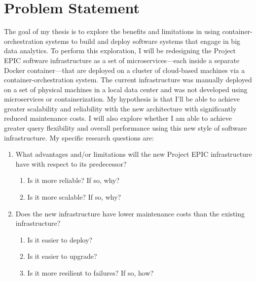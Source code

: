
\chapter{Problem Statement} %

\label{Chapter3} %

The goal of my thesis is to explore the benefits and limitations in using container-orchestration systems to build and deploy software systems that engage in big data analytics. To perform this exploration, I will be redesigning the Project EPIC software infrastructure as a set of microservices---each inside a separate Docker container---that are deployed on a cluster of cloud-based machines via a container-orchestration system. The current infrastructure was manually deployed on a set of physical machines in a local data center and was not developed using microservices or containerization. My hypothesis is that I’ll be able to achieve greater scalability and reliability with the new architecture with significantly reduced maintenance costs. I will also explore whether I am able to achieve greater query flexibility and overall performance using this new style of software infrastructure. My specific research questions are:

\begin{enumerate}
	\item What advantages and/or limitations will the new Project EPIC infrastructure have with respect to its predecessor?
	\begin{enumerate}
		\item Is it more reliable? If so, why?
		\item Is it more scalable? If so, why?
	\end{enumerate}
	\item Does the new infrastructure have lower maintenance costs than the existing infrastructure?
	\begin{enumerate}
		\item Is it easier to deploy?
		\item Is it easier to upgrade?
		\item Is it more resilient to failures? If so, how?
	\end{enumerate}
\end{enumerate}


